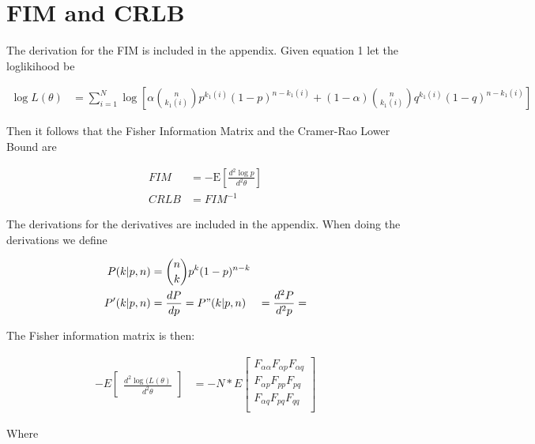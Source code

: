 \section{FIM and CRLB}

The derivation for the FIM is included in the appendix. Given equation 1 let the loglikihood be

\begin{align*}
\log L(\mathbb{\theta}) &= \sum_{i=1}^{N} \log \left[ \alpha \binom{n}{k_1(i)} p^{k_1(i)} (1-p)^{n - k_1(i)} + (1-\alpha) \binom{n}{k_1(i)} q^{k_1(i)} (1-q)^{n - k_1(i)}  \right] 
\end{align*}

Then it follows that the Fisher Information Matrix and the Cramer-Rao Lower Bound are

\begin{align*}
FIM &= -\mathrm{E} \left[\frac{d^2 \log p}{d^2\mathbb{\theta}}\right] \\
CRLB &= FIM^{-1}
\end{align*}

The derivations for the derivatives are included in the appendix. When doing the derivations we define

\begin{align*}
P(k | p, n) &= \binom{n}{k}p^{k}(1 - p)^{n - k} \\
P'(k | p, n) &= \frac{dP}{dp} = 
P"(k | p, n) &= \frac{d^2P}{d^2p} = 
\end{align*}

The Fisher information matrix is then:

\begin{align*}
-E\begin{bmatrix}\frac{d^2\log(L(\mathbb{\theta})}{d^2\theta}\end{bmatrix} &= -N * E\begin{bmatrix}
F_{\alpha\alpha} F_{\alpha p} F_{\alpha q} \\
F_{\alpha p} F_{pp} F_{pq} \\
F_{\alpha q} F_{pq} F_{qq} \\
\end{bmatrix}
\end{align*}

Where

